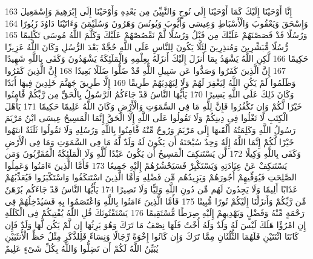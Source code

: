 \documentclass[20pt,a4paper]{article}
\begin{document}
{\tiny\colorbox{cl_aya}{163}} إِنَّا أَوْحَيْنَا إِلَيْكَ كَمَا أَوْحَيْنَا إِلَى نُوحٍ وَالنَّبِيِّنَ مِن بَعْدِهِ وَأَوْحَيْنَا إِلَى إِبْرَهِيمَ وَإِسْمَعِيلَ وَإِسْحَقَ وَيَعْقُوبَ وَالْأَسْبَاطِ وَعِيسَى وَأَيُّوبَ وَيُونُسَ وَهَرُونَ وَسُلَيْمَنَ وَءَاتَيْنَا دَاوُدَ زَبُورًا
{\tiny\colorbox{cl_aya}{164}} وَرُسُلًا قَدْ قَصَصْنَهُمْ عَلَيْكَ مِن قَبْلُ وَرُسُلًا لَّمْ نَقْصُصْهُمْ عَلَيْكَ وَكَلَّمَ اللَّهُ مُوسَى تَكْلِيمًا
{\tiny\colorbox{cl_aya}{165}} رُّسُلًا مُّبَشِّرِينَ وَمُنذِرِينَ لِئَلَّا يَكُونَ لِلنَّاسِ عَلَى اللَّهِ حُجَّةٌ بَعْدَ الرُّسُلِ وَكَانَ اللَّهُ عَزِيزًا حَكِيمًا
{\tiny\colorbox{cl_aya}{166}} لَّكِنِ اللَّهُ يَشْهَدُ بِمَا أَنزَلَ إِلَيْكَ أَنزَلَهُ بِعِلْمِهِ وَالْمَلَئِكَةُ يَشْهَدُونَ وَكَفَى بِاللَّهِ شَهِيدًا
{\tiny\colorbox{cl_aya}{167}} إِنَّ الَّذِينَ كَفَرُوا وَصَدُّوا عَن سَبِيلِ اللَّهِ قَدْ ضَلُّوا ضَلَلًا بَعِيدًا
{\tiny\colorbox{cl_aya}{168}} إِنَّ الَّذِينَ كَفَرُوا وَظَلَمُوا لَمْ يَكُنِ اللَّهُ لِيَغْفِرَ لَهُمْ وَلَا لِيَهْدِيَهُمْ طَرِيقًا
{\tiny\colorbox{cl_aya}{169}} إِلَّا طَرِيقَ جَهَنَّمَ خَلِدِينَ فِيهَا أَبَدًا وَكَانَ ذَلِكَ عَلَى اللَّهِ يَسِيرًا
{\tiny\colorbox{cl_aya}{170}} يَأَيُّهَا النَّاسُ قَدْ جَاءَكُمُ الرَّسُولُ بِالْحَقِّ مِن رَّبِّكُمْ فََٔامِنُوا خَيْرًا لَّكُمْ وَإِن تَكْفُرُوا فَإِنَّ لِلَّهِ مَا فِى السَّمَوَتِ وَالْأَرْضِ وَكَانَ اللَّهُ عَلِيمًا حَكِيمًا
{\tiny\colorbox{cl_aya}{171}} يَأَهْلَ الْكِتَبِ لَا تَغْلُوا فِى دِينِكُمْ وَلَا تَقُولُوا عَلَى اللَّهِ إِلَّا الْحَقَّ إِنَّمَا الْمَسِيحُ عِيسَى ابْنُ مَرْيَمَ رَسُولُ اللَّهِ وَكَلِمَتُهُ أَلْقَىهَا إِلَى مَرْيَمَ وَرُوحٌ مِّنْهُ فََٔامِنُوا بِاللَّهِ وَرُسُلِهِ وَلَا تَقُولُوا ثَلَثَةٌ انتَهُوا خَيْرًا لَّكُمْ إِنَّمَا اللَّهُ إِلَهٌ وَحِدٌ سُبْحَنَهُ أَن يَكُونَ لَهُ وَلَدٌ لَّهُ مَا فِى السَّمَوَتِ وَمَا فِى الْأَرْضِ وَكَفَى بِاللَّهِ وَكِيلًا
{\tiny\colorbox{cl_aya}{172}} لَّن يَسْتَنكِفَ الْمَسِيحُ أَن يَكُونَ عَبْدًا لِّلَّهِ وَلَا الْمَلَئِكَةُ الْمُقَرَّبُونَ وَمَن يَسْتَنكِفْ عَنْ عِبَادَتِهِ وَيَسْتَكْبِرْ فَسَيَحْشُرُهُمْ إِلَيْهِ جَمِيعًا
{\tiny\colorbox{cl_aya}{173}} فَأَمَّا الَّذِينَ ءَامَنُوا وَعَمِلُوا الصَّلِحَتِ فَيُوَفِّيهِمْ أُجُورَهُمْ وَيَزِيدُهُم مِّن فَضْلِهِ وَأَمَّا الَّذِينَ اسْتَنكَفُوا وَاسْتَكْبَرُوا فَيُعَذِّبُهُمْ عَذَابًا أَلِيمًا وَلَا يَجِدُونَ لَهُم مِّن دُونِ اللَّهِ وَلِيًّا وَلَا نَصِيرًا
{\tiny\colorbox{cl_aya}{174}} يَأَيُّهَا النَّاسُ قَدْ جَاءَكُم بُرْهَنٌ مِّن رَّبِّكُمْ وَأَنزَلْنَا إِلَيْكُمْ نُورًا مُّبِينًا
{\tiny\colorbox{cl_aya}{175}} فَأَمَّا الَّذِينَ ءَامَنُوا بِاللَّهِ وَاعْتَصَمُوا بِهِ فَسَيُدْخِلُهُمْ فِى رَحْمَةٍ مِّنْهُ وَفَضْلٍ وَيَهْدِيهِمْ إِلَيْهِ صِرَطًا مُّسْتَقِيمًا
{\tiny\colorbox{cl_aya}{176}} يَسْتَفْتُونَكَ قُلِ اللَّهُ يُفْتِيكُمْ فِى الْكَلَلَةِ إِنِ امْرُؤٌا هَلَكَ لَيْسَ لَهُ وَلَدٌ وَلَهُ أُخْتٌ فَلَهَا نِصْفُ مَا تَرَكَ وَهُوَ يَرِثُهَا إِن لَّمْ يَكُن لَّهَا وَلَدٌ فَإِن كَانَتَا اثْنَتَيْنِ فَلَهُمَا الثُّلُثَانِ مِمَّا تَرَكَ وَإِن كَانُوا إِخْوَةً رِّجَالًا وَنِسَاءً فَلِلذَّكَرِ مِثْلُ حَظِّ الْأُنثَيَيْنِ يُبَيِّنُ اللَّهُ لَكُمْ أَن تَضِلُّوا وَاللَّهُ بِكُلِّ شَىْءٍ عَلِيمٌ
\end{document}

